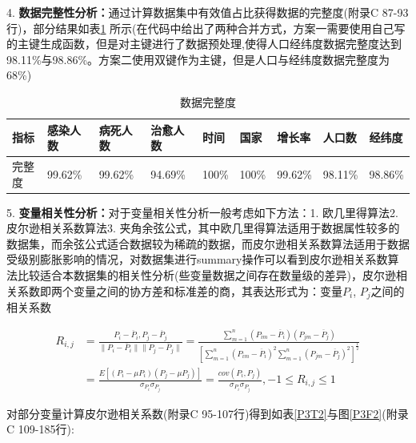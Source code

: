 \documentclass[a4paper, 11pt,twoside=true,UTF8]{scrartcl}
\begin{document}
4. \textbf{数据完整性分析：}通过计算数据集中有效值占比获得数据的完整度(附录C 87-93行)，部分结果如表\ref{P3T1} 所示(在代码中给出了两种合并方式，方案一需要使用自己写的主键生成函数，但是对主键进行了数据预处理,使得人口经纬度数据完整度达到98.11\%与98.86\%。方案二使用双键作为主键，但是人口与经纬度数据完整度为68\%) 
\begin{table}[H]
	\caption{数据完整度} \label{P3T1}
	\begin{tabular}{lllllllll}
		\hline
		\textbf{指标} & \textbf{感染人数} & \textbf{病死人数} & \textbf{治愈人数} & \textbf{时间} & \textbf{国家} & \textbf{增长率} & \textbf{人口数} & \textbf{经纬度} \\ \hline
		完整度         & 99.62\%       & 99.62\%       & 94.69\%       & 100\%         & 100\%         & 99.62\%      & 98.11\%      & 98.86\%      \\ \hline
	\end{tabular}
\end{table}

5. \textbf{变量相关性分析：}对于变量相关性分析一般考虑如下方法：1. 欧几里得算法2. 皮尔逊相关系数算法3. 夹角余弦公式，其中欧几里得算法适用于数据属性较多的数据集，而余弦公式适合数据较为稀疏的数据，而皮尔逊相关系数算法适用于数据受级别膨胀影响的情况，对数据集进行summary操作可以看到皮尔逊相关系数算法比较适合本数据集的相关性分析(些变量数据之间存在数量级的差异)，皮尔逊相关系数即两个变量之间的协方差和标准差的商，其表达形式为：变量$P_i$, $P_j$之间的相关系数

$$
\begin{aligned}
R_{i,j} & =\frac{P_i-\overline P_i,P_j-\overline P_j}{\|P_i-\overline P_i\|\|P_j-\overline P_j\|}
 = \frac{\sum_{m=1}^{n}(P_{im}-\overline P_i)(P_{jm}-\overline P_j)}{\left[ \sum_{m=1}^{n}(P_{im}-\overline P_i)^2 \sum_{m=1}^{n}(P_{jm}-\overline P_j)^2 \right]^{\frac{1}{2}}}\\
& =\frac{E\left[(P_i-\mu P_i)(P_j-\mu P_j)\right]}{\sigma_{P_i}\sigma_{P_j}}
 =\frac{cov(P_i,P_j)}{\sigma_{P_i}\sigma_{P_j}}  ,-1\leq R_{i,j}\leq 1
\end{aligned}
$$

对部分变量计算皮尔逊相关系数(附录C 95-107行)得到如表\ref{P3T2}与图\ref{P3F2}(附录C 109-185行):
\end{document}
